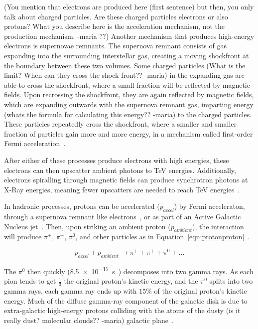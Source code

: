   {\color{red}(You mention that electrons are produced here (first sentence) but then, you only talk about charged particles. Are these charged particles electrons or also protons?  What you describe here is the acceleration mechanism, not the production mechanism. -maria ??)}
  Another mechanism that produces high-energy electrons is supernovae remnants.
  The supernova remnant consists of gas expanding into the surrounding interstellar gas, creating a moving shockfront at the boundary between these two volumes.
  {\color{red}Some charged particles (What is the limit? When can they cross the shock front?? -maria)} in the expanding gas are able to cross the shockfront, where a small fraction will be reflected by magnetic fields.
  Upon recrossing the shockfront, they are again reflected by magnetic fields, which are expanding outwards with the supernova remnant gas, {\color{red}imparting energy (whats the formula for calculating this energy?? -maria)} to the charged particles.
  These particles repeatedly cross the shockfront, where a smaller and smaller fraction of particles gain more and more energy, in a mechanism called first-order Fermi acceleration~\cite{fermi1949,highenergyelectron_snr}.
  
  After either of these processes produce electrons with high energies, these electrons can then upscatter ambient photons to TeV energies.
  Additionally, electrons spiralling through magnetic fields can produce synchrotron photons at X-Ray energies, meaning fewer upscatters are needed to reach TeV energies~\cite{self_compton}.

  In hadronic processes, protons can be accelerated ($p_{accel}$) by Fermi acceleraton, through a supernova remnant like electrons~\cite{proton_snr_accel}, or as part of an Active Galactic Nucleus jet~\cite{hadronic1,hadronic2}.
  Then, upon striking an ambient proton ($p_{ambient}$), the interaction will produce $\pi^{+}$, $\pi^{-}$, $\pi^{0}$, and other particles as in Equation~\ref{eqn:protonproton}~\cite{pp_pion,pp_pion2}.
  
  \begin{equation}\label{eqn:protonproton}
    p_{accel} + p_{ambient} \rightarrow \pi^+ + \pi^+ + \pi^0 + ...
  \end{equation}

  The $\pi^{0}$ then quickly (\SI{8.5e-17}{s}~\cite{pdg2016}) decomposes into two gamma rays.
  As each pion tends to get $\frac{1}{3}$ the original proton's kinetic energy, and the $\pi^0$ splits into two gamma rays, each gamma ray ends up with \nicetilde$15\%$ of the original proton's kinetic energy.
  Much of the diffuse gamma-ray component of the galactic disk is due to extra-galactic high-energy protons colliding with the atoms of the {\color{red}dusty (is it really dust? molecular clouds?? -maria)} galactic plane~\cite{GalacticDiffuseGammaRays}.

